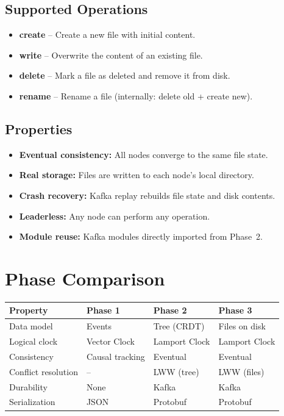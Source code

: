 \documentclass[12pt, a4paper]{article}
\begin{document}
\subsection{Supported Operations}

\begin{itemize}
    \item \textbf{create} -- Create a new file with initial content.
    \item \textbf{write} -- Overwrite the content of an existing file.
    \item \textbf{delete} -- Mark a file as deleted and remove it from disk.
    \item \textbf{rename} -- Rename a file (internally: delete old + create new).
\end{itemize}

\subsection{Properties}

\begin{itemize}
    \item \textbf{Eventual consistency:} All nodes converge to the same file state.
    \item \textbf{Real storage:} Files are written to each node's local directory.
    \item \textbf{Crash recovery:} Kafka replay rebuilds file state and disk contents.
    \item \textbf{Leaderless:} Any node can perform any operation.
    \item \textbf{Module reuse:} Kafka modules directly imported from Phase~2.
\end{itemize}

\section{Phase Comparison}

\begin{table}[ht]
\centering
\begin{tabularx}{\textwidth}{lXXX}
\toprule
\textbf{Property} & \textbf{Phase 1} & \textbf{Phase 2} & \textbf{Phase 3} \\
\midrule
Data model & Events & Tree (CRDT) & Files on disk \\
Logical clock & Vector Clock & Lamport Clock & Lamport Clock \\
Consistency & Causal tracking & Eventual & Eventual \\
Conflict resolution & -- & LWW (tree) & LWW (files) \\
Durability & None & Kafka & Kafka \\
Serialization & JSON & Protobuf & Protobuf \\
\bottomrule
\end{tabularx}
\end{table}
\end{document}
